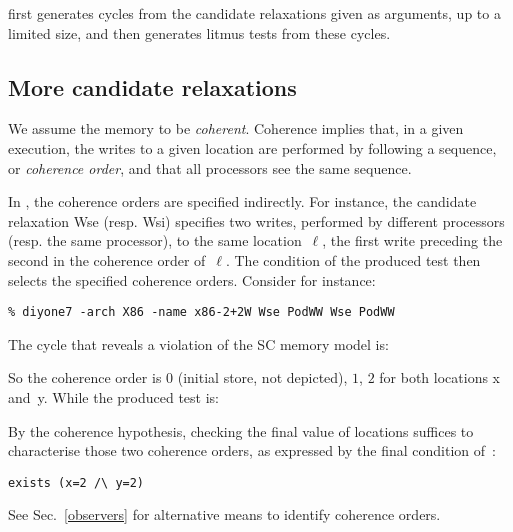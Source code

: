 \diy{} first generates cycles from the candidate relaxations
given as arguments, up to a limited size, and then generates
litmus tests from these cycles.

\subsection{More candidate relaxations}

We assume the memory to be \emph{coherent}.
Coherence implies that, in a given execution,
the writes to a given location are performed by following a sequence,
or \emph{coherence order},
and that all processors see the same sequence.


\label{sec:ws}In \diy{}, the coherence orders are specified indirectly.
For instance, the candidate relaxation Wse (resp. Wsi) specifies two writes,
performed by different processors (resp. the same processor),
to the same location~$\ell$, the first write preceding the second in
the coherence order of~$\ell$.
The condition of the produced test then selects the specified coherence orders.
Consider for instance:
\begin{verbatim}
% diyone7 -arch X86 -name x86-2+2W Wse PodWW Wse PodWW
\end{verbatim}
The cycle that reveals a violation of the SC memory model is:
\begin{center}
\end{center}
So the coherence order is $0$ (initial store, not depicted),
$1$, $2$ for both locations x and~y.
While the produced test is:

By the coherence hypothesis, checking the final
value of locations suffices to characterise those two coherence orders,
as expressed by the final condition of~:
\begin{verbatim}
exists (x=2 /\ y=2)
\end{verbatim}
See Sec.~\ref{observers} for alternative means
to identify coherence orders.

